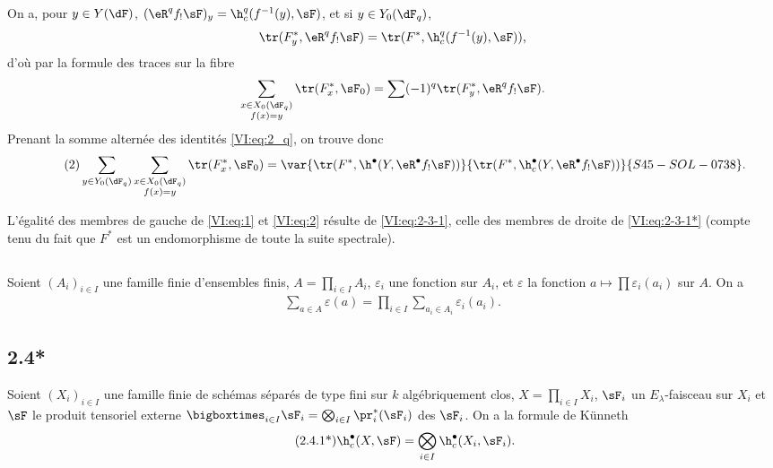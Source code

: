 On a, pour $y\in Y(\dF)$, $(\eR^q f_! \sF)_y = \h_c^q(f^{-1}(y),\sF)$, et si 
$y\in Y_0(\dF_q)$, 
\[
  \tr(F_y^\ast,\eR^q f_! \sF) = \tr(F^\ast,\h_c^q(f^{-1}(y),\sF)) \text{,}
\]
d'où par la formule des traces sur la fibre 
\[
  \sum_{\substack{x\in X_0(\dF_q) \\ f(x) = y}} \tr(F_x^\ast,\sF_0) = \sum (-1)^q \tr(F_y^\ast,\eR^q f_! \sF) \text{.}
\]
Prenant la somme alternée des identités \eqref{VI:eq:2_q}, on trouve donc 
\begin{align*}\tag{2}\label{VI:eq:2}
  \sum_{y\in Y_0(\dF_q)} \sum_{\substack{x \in X_0(\dF_q) \\ f(x) = y}} \tr(F_x^\ast,\sF_0) = \var{\tr(F^\ast,\h^\bullet(Y,\eR^\bullet f_! \sF))}{\tr(F^\ast,\h_c^\bullet(Y,\eR^\bullet f_! \sF))}{S45-SOL-0738} \text{.}
\end{align*}

L'égalité des membres de gauche de \eqref{VI:eq:1} et \eqref{VI:eq:2} 
résulte de \eqref{VI:eq:2-3-1}, celle des membres de droite de 
\eqref{VI:eq:2-3-1*} (compte tenu du fait que $F^\ast$ est un endomorphisme de 
toute la suite spectrale). 





\subsection{}\label{VI:2-4}

Soient $(A_i)_{i\in I}$ une famille finie d'ensembles finis, 
$A=\prod_{i\in I} A_i$, $\varepsilon_i$ une fonction sur $A_i$, et 
$\varepsilon$ la fonction $a\mapsto \prod \varepsilon_i(a_i)$ sur $A$. On a 
\begin{align*}\tag{2.4.1}\label{VI:eq:2-4-1}
  \sum_{a\in A} \varepsilon(a) = \prod_{i\in I} \sum_{a_i\in A_i} \varepsilon_i(a_i) \text{.}
\end{align*}





\subsection*{2.4*}\label{VI:2-4*}

Soient $(X_i)_{i\in I}$ une famille finie de schémas séparés de type fini 
sur $k$ algébriquement clos, $X=\prod_{i\in I} X_i$, $\sF_i$ un 
$E_\lambda$-faisceau sur $X_i$ et $\sF$ le produit tensoriel externe 
$\bigboxtimes_{i\in I}\sF_i = \bigotimes_{i\in I} \pr_i^\ast(\sF_i)$ 
des $\sF_i$. On a la formule de K\"unneth 
\begin{align*}\tag{2.4.1*}\label{VI:eq:2-4-1*}
  \h_c^\bullet(X,\sF) = \bigotimes_{i\in I} \h_c^\bullet(X_i,\sF_i) \text{.}
\end{align*}

